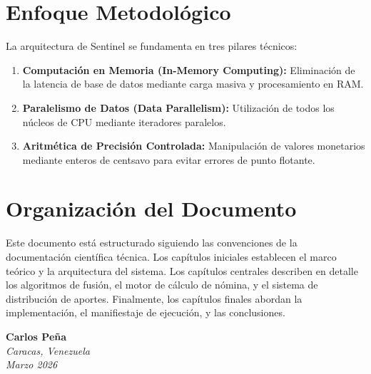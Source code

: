 \bigskip

\section*{Enfoque Metodológico}

La arquitectura de Sentinel se fundamenta en tres pilares técnicos:

\begin{enumerate}
    \item \textbf{Computación en Memoria (In-Memory Computing):} Eliminación de la latencia de base de datos mediante carga masiva y procesamiento en RAM.
    \item \textbf{Paralelismo de Datos (Data Parallelism):} Utilización de todos los núcleos de CPU mediante iteradores paralelos.
    \item \textbf{Aritmética de Precisión Controlada:} Manipulación de valores monetarios mediante enteros de centsavo para evitar errores de punto flotante.
\end{enumerate}

\bigskip

\section*{Organización del Documento}

Este documento está estructurado siguiendo las convenciones de la documentación científica técnica. Los capítulos iniciales establecen el marco teórico y la arquitectura del sistema. Los capítulos centrales describen en detalle los algoritmos de fusión, el motor de cálculo de nómina, y el sistema de distribución de aportes. Finalmente, los capítulos finales abordan la implementación, el manifiestaje de ejecución, y las conclusiones.

\bigskip

\begin{flushright}
    \textbf{Carlos Peña} \\
    \textit{Caracas, Venezuela} \\
    \textit{Marzo 2026}
\end{flushright}

\vfill
\newpage

